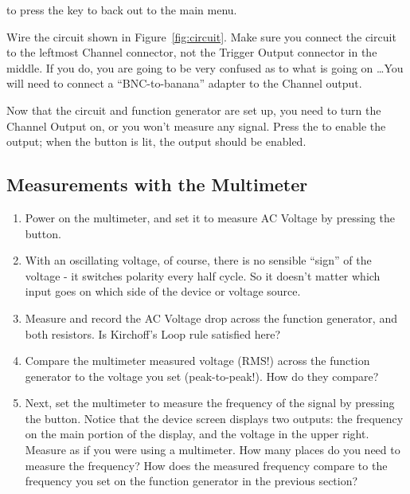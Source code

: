 \documentclass[12pt]{article}
\begin{document}
\begin{enumerate}
\begin{compactenum}
    to press the \keys{\arrowkeyup} key to back out to the main menu.
  \item Wire the circuit shown in Figure~\ref{fig:circuit}.  Make sure
    you connect the circuit to the leftmost Channel connector, not the
    Trigger Output connector in the middle.  If you do, you are going
    to be very confused as to what is going on \ldots You will need to
    connect a ``BNC-to-banana'' adapter to the Channel output.
  \item Now that the circuit and function generator are set up, you
    need to turn the Channel Output on, or you won't measure any
    signal.  Press the  to enable the output;
    when the button is lit, the output should be enabled.
  \end{compactenum}
\end{enumerate}

\subsection{Measurements with the Multimeter}
\label{sec:multimeter}

\begin{enumerate}
\item Power on the multimeter, and set it to measure AC Voltage by
  pressing the  button.
\item With an oscillating voltage, of course, there is no sensible
  ``sign'' of the voltage - it switches polarity every half cycle.  So
  it doesn't matter which input goes on which side of the device or
  voltage source.
\item Measure and record the AC Voltage drop across the function
  generator, and both resistors.  Is Kirchoff's Loop rule satisfied
  here? 
\item Compare the multimeter measured voltage (RMS!) across the
  function generator to the voltage you set (peak-to-peak!).  How do
  they compare?
\item Next, set the multimeter to measure the frequency of the signal
  by pressing the  button.  Notice that the device screen
  displays two outputs: the frequency on the main portion of the
  display, and the voltage in the upper right.  Measure as if you were
  using a multimeter.  How many places do you need to measure the
  frequency?  How does the measured frequency compare to the frequency
  you set on the function generator in the previous section?
\end{enumerate}
\end{document}
